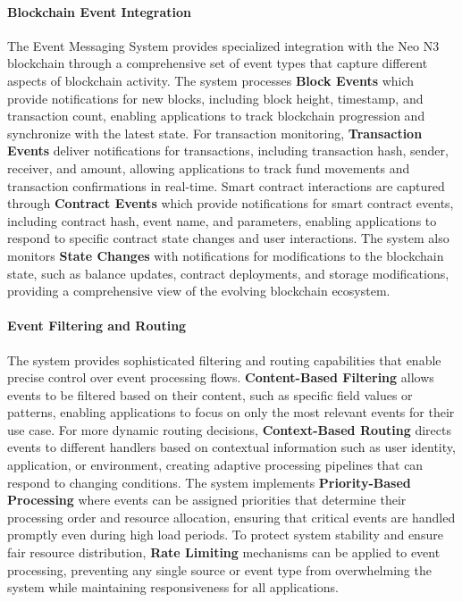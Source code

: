 \documentclass[12pt,a4paper]{article}
\begin{document}
\paragraph{Blockchain Event Integration}
The Event Messaging System provides specialized integration with the Neo N3 blockchain through a comprehensive set of event types that capture different aspects of blockchain activity. The system processes \textbf{Block Events} which provide notifications for new blocks, including block height, timestamp, and transaction count, enabling applications to track blockchain progression and synchronize with the latest state. For transaction monitoring, \textbf{Transaction Events} deliver notifications for transactions, including transaction hash, sender, receiver, and amount, allowing applications to track fund movements and transaction confirmations in real-time. Smart contract interactions are captured through \textbf{Contract Events} which provide notifications for smart contract events, including contract hash, event name, and parameters, enabling applications to respond to specific contract state changes and user interactions. The system also monitors \textbf{State Changes} with notifications for modifications to the blockchain state, such as balance updates, contract deployments, and storage modifications, providing a comprehensive view of the evolving blockchain ecosystem.

\paragraph{Event Filtering and Routing}
The system provides sophisticated filtering and routing capabilities that enable precise control over event processing flows. \textbf{Content-Based Filtering} allows events to be filtered based on their content, such as specific field values or patterns, enabling applications to focus on only the most relevant events for their use case. For more dynamic routing decisions, \textbf{Context-Based Routing} directs events to different handlers based on contextual information such as user identity, application, or environment, creating adaptive processing pipelines that can respond to changing conditions. The system implements \textbf{Priority-Based Processing} where events can be assigned priorities that determine their processing order and resource allocation, ensuring that critical events are handled promptly even during high load periods. To protect system stability and ensure fair resource distribution, \textbf{Rate Limiting} mechanisms can be applied to event processing, preventing any single source or event type from overwhelming the system while maintaining responsiveness for all applications.
\end{document}
